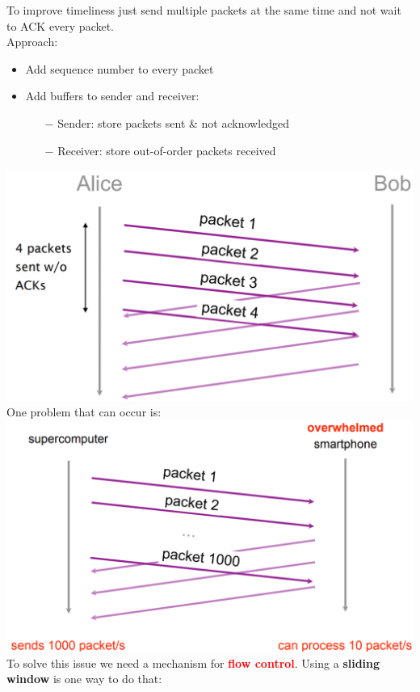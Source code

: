 \documentclass[a4paper, fontsize=8pt, landscape, DIV=1]{scrartcl}
\begin{document}
\begin{multicols*}{4}
    		To improve timeliness just send multiple packets at the same time and not wait to ACK every packet. \\
    		Approach: 
    		\begin{itemize}[noitemsep]
    			\item Add sequence number to every packet
    			\item Add buffers to sender and receiver: 
    			\begin{itemize}
    				\item[$-$] Sender: store packets sent \& not acknowledged
    				\item[$-$] Receiver: store out-of-order packets received
    			\end{itemize}
    		\end{itemize} 
    		\includegraphics[width=\columnwidth]{images/Concepts/packets_wo_ack.png} 	 
    		One problem that can occur is: 
    		\includegraphics[width=\columnwidth]{images/Concepts/packets_wo_ack_problem.png} 
    		To solve this issue  we need a mechanism for \textcolor{Red}{\textbf{flow control}}.
    		Using a \textbf{sliding window} is one way to do that:

\end{multicols*}
\end{document}
